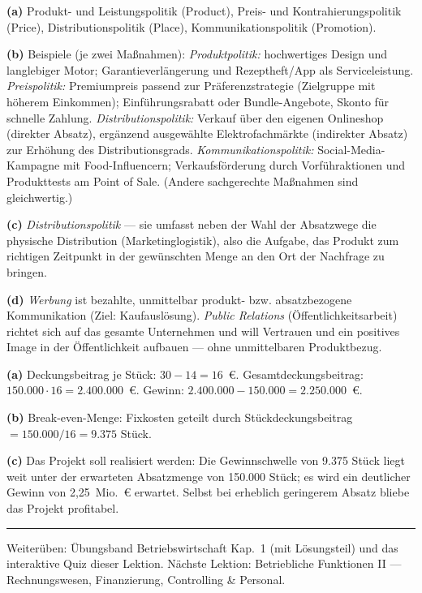 \documentclass[11pt, a4paper]{article}
\begin{document}
\begin{loesung}[title={Lösung Aufgabe~8 --- Fallaufgabe Marketing-Mix}]
\textbf{(a)} Produkt- und Leistungspolitik (Product), Preis- und Kontrahierungspolitik
(Price), Distributionspolitik (Place), Kommunikationspolitik (Promotion).

\textbf{(b)} Beispiele (je zwei Maßnahmen): \emph{Produktpolitik:} hochwertiges Design
und langlebiger Motor; Garantieverlängerung und Rezeptheft/App als Serviceleistung.
\emph{Preispolitik:} Premiumpreis passend zur Präferenzstrategie (Zielgruppe mit
höherem Einkommen); Einführungsrabatt oder Bundle-Angebote, Skonto für schnelle
Zahlung. \emph{Distributionspolitik:} Verkauf über den eigenen Onlineshop (direkter
Absatz), ergänzend ausgewählte Elektrofachmärkte (indirekter Absatz) zur Erhöhung des
Distributionsgrads. \emph{Kommunikationspolitik:} Social-Media-Kampagne mit
Food-Influencern; Verkaufsförderung durch Vorführaktionen und Produkttests am Point of
Sale. (Andere sachgerechte Maßnahmen sind gleichwertig.)

\textbf{(c)} \emph{Distributionspolitik} --- sie umfasst neben der Wahl der Absatzwege
die physische Distribution (Marketinglogistik), also die Aufgabe, das Produkt zum
richtigen Zeitpunkt in der gewünschten Menge an den Ort der Nachfrage zu bringen.

\textbf{(d)} \emph{Werbung} ist bezahlte, unmittelbar produkt- bzw. absatzbezogene
Kommunikation (Ziel: Kaufauslösung). \emph{Public Relations} (Öffentlichkeitsarbeit)
richtet sich auf das gesamte Unternehmen und will Vertrauen und ein positives Image in
der Öffentlichkeit aufbauen --- ohne unmittelbaren Produktbezug.
\end{loesung}

\begin{loesung}[title={Lösung Aufgabe~9 --- Erfolgsrechnung zur Produkteinführung}]
\textbf{(a)} Deckungsbeitrag je Stück: $30 - 14 = 16$~€. Gesamtdeckungsbeitrag:
$150.000 \cdot 16 = 2.400.000$~€. Gewinn: $2.400.000 - 150.000 = 2.250.000$~€.

\textbf{(b)} Break-even-Menge: Fixkosten geteilt durch Stückdeckungsbeitrag $=
150.000 / 16 = 9.375$ Stück.

\textbf{(c)} Das Projekt soll realisiert werden: Die Gewinnschwelle von 9.375 Stück
liegt weit unter der erwarteten Absatzmenge von 150.000 Stück; es wird ein deutlicher
Gewinn von 2,25~Mio.~€ erwartet. Selbst bei erheblich geringerem Absatz bliebe das
Projekt profitabel.
\end{loesung}

\vspace{1em}
\hrule
\vspace{0.8em}
\noindent\textsf{\small Weiterüben: Übungsband Betriebswirtschaft Kap.~1 (mit Lösungsteil) und das
interaktive Quiz dieser Lektion. Nächste Lektion: Betriebliche Funktionen II --- Rechnungswesen,
Finanzierung, Controlling \& Personal.}
\end{document}
